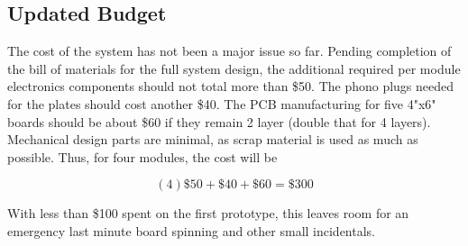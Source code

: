 \documentclass{article}
\begin{document}
	\subsection{Updated Budget}

	\color{gray}

	The cost of the system has not been a major issue so far.  Pending completion of the bill of materials for the full system design, the additional required per module electronics components should not total more than \$50.  The phono plugs needed for the plates should cost another \$40.  The PCB manufacturing for five 4"x6" boards should be about \$60 if they remain 2 layer (double that for 4 layers).  Mechanical design parts are minimal, as scrap material is used as much as possible.  Thus, for four modules, the cost will be 

	$$ (4)\$50 + \$40 + \$60 = \$300 $$

	With less than \$100 spent on the first prototype, this leaves room for an emergency last minute board spinning and other small incidentals.

	\color{black}


\newpage


\end{document}
